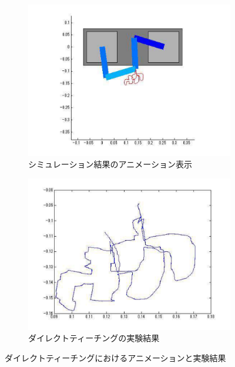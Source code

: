 \begin{figure}[H]
    \centering
    \begin{subfigure}[b]{0.45\linewidth}
        \centering
        \includegraphics[width=\linewidth]{figure/dairekuto_anime.pdf}
        \caption{シミュレーション結果のアニメーション表示}
        \label{fig:direct_teaching_anim}
    \end{subfigure}
    \begin{subfigure}[b]{0.45\linewidth}
        \centering
        \includegraphics[width=\linewidth]{figure/ex_kekka.pdf}
        \caption{ダイレクトティーチングの実験結果}
        \label{fig:direct_teaching_result}
    \end{subfigure}
    \caption{ダイレクトティーチングにおけるアニメーションと実験結果}
\end{figure}
